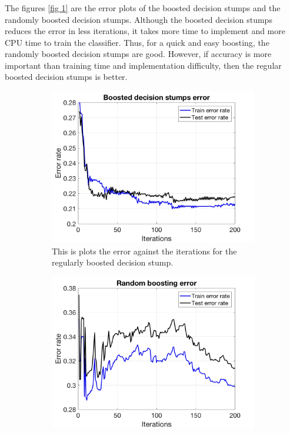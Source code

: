 \documentclass[11pt,a4paper,titlepage]{article}
\begin{document}
{{\subsubsection{}{
\quad The figures \ref{fig 1} are the error plots of the boosted decision stumps and the randomly boosted decision stumps. Although the boosted decision stumps reduces the error in less iterations, it takes more time to implement and more CPU time to train the classifier. Thus, for a quick and easy boosting, the randomly boosted decision stumps are good. However, if accuracy is more important than training time and implementation difficulty, then the regular boosted decision stumps is better.
\begin{figure}
\centering
\begin{subfigure}{.5\textwidth}
  \centering
  \includegraphics[width=\linewidth]{Boosted_decision}
  \caption{This is plots the error against the iterations for the regularly boosted decision stump.}
  \label{fig1:sub1}
\end{subfigure}%
\begin{subfigure}{.5\textwidth}
  \centering
  \includegraphics[width=\linewidth]{Random_boosting}

\end{subfigure}
\end{figure}}}}
\end{document}
